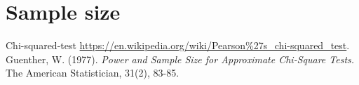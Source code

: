 \documentclass{article}
\begin{document}
\section{Sample size}


\begin{thebibliography}{9}
    Chi-squared-test 
    \url{https://en.wikipedia.org/wiki/Pearson\%27s\_chi-squared\_test}.
    Guenther, W. (1977). 
    \textit{Power and Sample Size for Approximate Chi-Square Tests.} 
    The American Statistician, 31(2), 83-85.

\end{thebibliography}   
\end{document}
